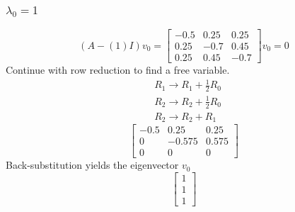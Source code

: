 \documentclass[12pt]{article}
\begin{document}
\subsubsection*{$\lambda_0 = 1$}
\begin{equation*}
    (A - (1)I)v_0 = \begin{bmatrix}
        -0.5 & 0.25 & 0.25 \\
        0.25 & -0.7 & 0.45 \\
        0.25 & 0.45 & -0.7 
    \end{bmatrix}v_0 = 0
\end{equation*}
Continue with row reduction to find a free variable.
\begin{align*}
     &R_1 \to R_1 + \frac{1}{2}R_0 \\
    &R_2 \to R_2 + \frac{1}{2}R_0 \\
    &R_2 \to R_2 + R_1 
\end{align*}
\begin{equation*}
    \begin{bmatrix}
       -0.5 & 0.25 & 0.25 \\
       0 & -0.575 & 0.575 \\
       0 & 0 & 0
    \end{bmatrix}
\end{equation*}
Back-substitution yields the eigenvector $v_0$
\begin{equation*}
    \begin{bmatrix}
        1 \\
        1 \\
        1
    \end{bmatrix}
\end{equation*}
\end{document}
